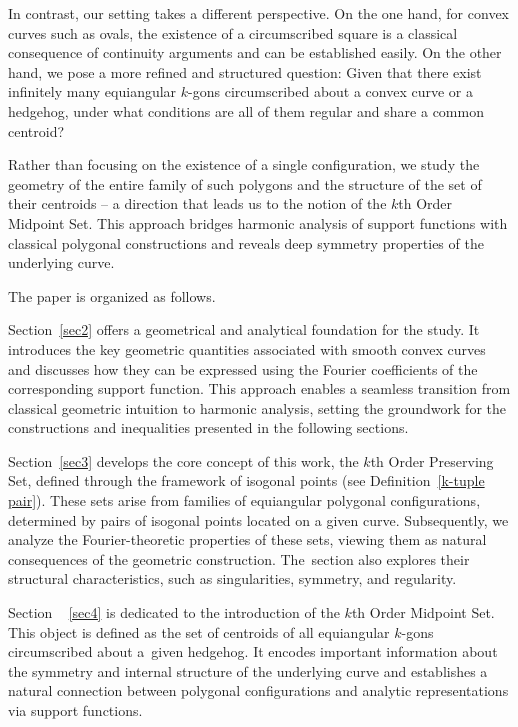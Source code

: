 \documentclass{amsart}
\theoremstyle{definition}
\numberwithin{equation}{section}
\begin{document}
In contrast, our setting takes a different perspective. On the one hand, for convex curves such as ovals, the existence of a circumscribed square is a classical consequence of continuity arguments and can be established easily. On the other hand, we pose a more refined and structured question:
Given that there exist infinitely many equiangular $k$-gons circumscribed about a convex curve or a hedgehog, under what conditions are all of them regular and share a common centroid?

Rather than focusing on the existence of a single configuration, we study the geometry of the entire family of such polygons and the structure of the set of their centroids -- a direction that leads us to the notion of the $k$th Order Midpoint Set. This approach bridges harmonic analysis of support functions with classical polygonal constructions and reveals deep symmetry properties of the underlying curve.

The paper is organized as follows.
 
Section~\ref{sec2} offers a geometrical and analytical foundation for the study.
It introduces the key geometric quantities associated with smooth convex curves and discusses how they can be expressed using the Fourier coefficients of the corresponding support function. This approach enables a seamless transition from classical geometric intuition to harmonic analysis, setting the groundwork for the constructions and inequalities presented in the following sections.

Section~\ref{sec3} develops the core concept of this work, the $k$th Order Preserving Set, defined through the framework of isogonal points (see Definition~\ref{k-tuple pair}).
These sets arise from families of equiangular polygonal configurations, determined by pairs of isogonal points located on a given curve. Subsequently, we analyze the Fourier-theoretic properties of these sets, viewing them as natural consequences of the geometric construction. The~section also explores their structural characteristics, such as singularities, symmetry, and regularity.

Section ~ \ref{sec4} is dedicated to the introduction of the $k$th Order Midpoint Set.
This object is defined as the set of centroids of all equiangular $k$-gons circumscribed about a~given hedgehog. It encodes important information about the symmetry and internal structure of the underlying curve and establishes a natural connection between polygonal configurations and analytic representations via support functions.
\end{document}
